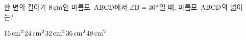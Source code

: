 한 변의 길이가 $8\mkern3mu \mathrm{cm}$인 마름모~$\mathrm{ABCD}$에서 $\angle\mathrm{B}=30^\circ$일 때, 마름모~$\mathrm{ABCD}$의 넓이는?
\begin{choices32}{$16\mkern3mu \mathrm{cm}^2$}{$24\mkern3mu \mathrm{cm}^2$}{$32\mkern3mu \mathrm{cm}^2$}{$36\mkern3mu \mathrm{cm}^2$}{$48\mkern3mu \mathrm{cm}^2$}\end{choices32}
